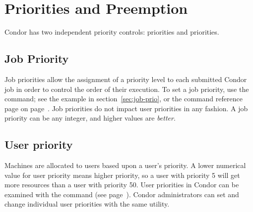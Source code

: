 \section{\label{sec:Priorities}Priorities and Preemption}

Condor has two independent priority controls: 
priorities and  priorities.  

\subsection{Job Priority}

Job priorities allow the assignment of a priority level to
each submitted Condor job in order to
control the order of their execution.
To set a job priority, use the  command;
see the example in section~\ref{sec:job-prio}, or the
command reference page on page~\pageref{man-condor-prio}.
Job priorities do not impact user priorities in any fashion.
A job priority can be any integer, and higher values are \emph{better}.

\subsection{\label{sec:user-priority-explained}User priority}

Machines are allocated to users based upon a user's priority.
A lower numerical value for user priority means higher priority,
so a user with priority 5 will get more resources than
a user with priority 50.
User priorities in Condor can be examined with the 
command (see page~\pageref{man-condor-userprio}).
Condor administrators can set and change individual user priorities
with the same utility.

